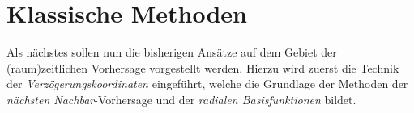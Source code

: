 \section{Klassische Methoden}
Als nächstes sollen nun die bisherigen Ansätze auf dem Gebiet der (raum)zeitlichen Vorhersage vorgestellt werden. Hierzu wird zuerst die Technik der \textit{Verzögerungskoordinaten} eingeführt, welche die Grundlage der Methoden der \textit{nächsten Nachbar}-Vorhersage und der \textit{radialen Basisfunktionen} bildet.
 


